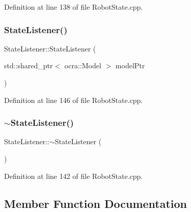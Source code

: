 Definition at line 138 of file Robot\+State.\+cpp.

\hypertarget{classocra__recipes_1_1StateListener_a6861fabf2b226ce71ba2bcfa766a4538}{}\label{classocra__recipes_1_1StateListener_a6861fabf2b226ce71ba2bcfa766a4538} 
\subsubsection{\texorpdfstring{State\+Listener()}{StateListener()}\hspace{0.1cm}{\footnotesize\ttfamily [2/2]}}
{\footnotesize\ttfamily State\+Listener\+::\+State\+Listener (\begin{DoxyParamCaption}\item[{std\+::shared\+\_\+ptr$<$ ocra\+::\+Model $>$}]{model\+Ptr }\end{DoxyParamCaption})}



Definition at line 146 of file Robot\+State.\+cpp.

\hypertarget{classocra__recipes_1_1StateListener_a84961512f9533cc039ca2deefbabbb73}{}\label{classocra__recipes_1_1StateListener_a84961512f9533cc039ca2deefbabbb73} 
\subsubsection{\texorpdfstring{$\sim$\+State\+Listener()}{~StateListener()}}
{\footnotesize\ttfamily State\+Listener\+::$\sim$\+State\+Listener (\begin{DoxyParamCaption}{ }\end{DoxyParamCaption})\hspace{0.3cm}{\ttfamily [virtual]}}



Definition at line 142 of file Robot\+State.\+cpp.



\subsection{Member Function Documentation}
\hypertarget{classocra__recipes_1_1StateListener_a10196cebd253c4b98fb39371c95cc68a}{}\label{classocra__recipes_1_1StateListener_a10196cebd253c4b98fb39371c95cc68a} 
